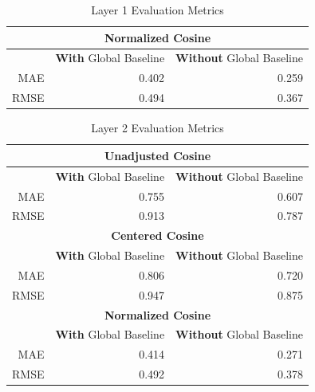 \documentclass[twoside,11pt]{article}
\begin{document}
{\begin{table}[H]
\begin{center}
\begin{tabular}{ |r||r|r| }
			\hline
			\hline

			\multicolumn{3}{|c|}{\textbf{Normalized Cosine}} \\
			\hline\hline
    		& \textbf{With} Global Baseline & \textbf{Without} Global Baseline  \\
    		\hline
			MAE & 0.402 & 0.259 \\
			\hline
			RMSE & 0.494 & 0.367 \\
			\hline
		\end{tabular}
	\end{center}
	\caption{Layer 1 Evaluation Metrics }
	\label{table:evaluation-1}
\end{table}

\begin{table}[H]
	\begin{center}
		\begin{tabular}{ |r||r|r| }
			\hline

			\multicolumn{3}{|c|}{\textbf{Unadjusted Cosine}} \\
			\hline\hline
    		& \textbf{With} Global Baseline & \textbf{Without} Global Baseline  \\
    		\hline
			MAE & 0.755 & 0.607 \\
			\hline
			RMSE & 0.913 & 0.787 \\

            \hline
            \hline

			\multicolumn{3}{|c|}{\textbf{Centered Cosine}} \\
			\hline\hline
    		& \textbf{With} Global Baseline & \textbf{Without} Global Baseline  \\
    		\hline
			MAE & 0.806 & 0.720 \\
			\hline
			RMSE & 0.947 & 0.875 \\

			\hline
			\hline

			\multicolumn{3}{|c|}{\textbf{Normalized Cosine}} \\
			\hline\hline
    		& \textbf{With} Global Baseline & \textbf{Without} Global Baseline  \\
    		\hline
			MAE & 0.414 & 0.271 \\
			\hline
			RMSE & 0.492 & 0.378 \\
			\hline
		\end{tabular}
	\end{center}
	\caption{Layer 2 Evaluation Metrics }
	\label{table:evaluation-2}
\end{table}

}
\end{document}
